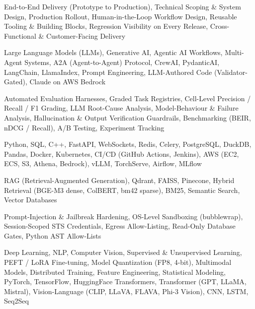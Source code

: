 \documentclass[letter,10pt]{article}
\begin{document}
 End-to-End Delivery (Prototype to Production), Technical Scoping \& System Design, Production Rollout, Human-in-the-Loop Workflow Design, Reusable Tooling \& Building Blocks, Regression Visibility on Every Release, Cross-Functional \& Customer-Facing Delivery\par\vspace{2pt}

 Large Language Models (LLMs), Generative AI, Agentic AI Workflows, Multi-Agent Systems, A2A (Agent-to-Agent) Protocol, CrewAI, PydanticAI, LangChain, LlamaIndex, Prompt Engineering, LLM-Authored Code (Validator-Gated), Claude on AWS Bedrock\par\vspace{2pt}

 Automated Evaluation Harnesses, Graded Task Registries, Cell-Level Precision / Recall / F1 Grading, LLM Root-Cause Analysis, Model-Behaviour \& Failure Analysis, Hallucination \& Output Verification Guardrails, Benchmarking (BEIR, nDCG / Recall), A/B Testing, Experiment Tracking\par\vspace{2pt}

 Python, SQL, C++, FastAPI, WebSockets, Redis, Celery, PostgreSQL, DuckDB, Pandas, Docker, Kubernetes, CI/CD (GitHub Actions, Jenkins), AWS (EC2, ECS, S3, Athena, Bedrock), vLLM, TorchServe, Airflow, MLflow\par\vspace{2pt}

 RAG (Retrieval-Augmented Generation), Qdrant, FAISS, Pinecone, Hybrid Retrieval (BGE-M3 dense, ColBERT, bm42 sparse), BM25, Semantic Search, Vector Databases\par\vspace{2pt}

 Prompt-Injection \& Jailbreak Hardening, OS-Level Sandboxing (bubblewrap), Session-Scoped STS Credentials, Egress Allow-Listing, Read-Only Database Gates, Python AST Allow-Lists\par\vspace{2pt}

 Deep Learning, NLP, Computer Vision, Supervised \& Unsupervised Learning, PEFT / LoRA Fine-tuning, Model Quantization (FP8, 4-bit), Multimodal Models, Distributed Training, Feature Engineering, Statistical Modeling, PyTorch, TensorFlow, HuggingFace Transformers, Transformer (GPT, LLaMA, Mistral), Vision-Language (CLIP, LLaVA, FLAVA, Phi-3 Vision), CNN, LSTM, Seq2Seq
\end{document}
